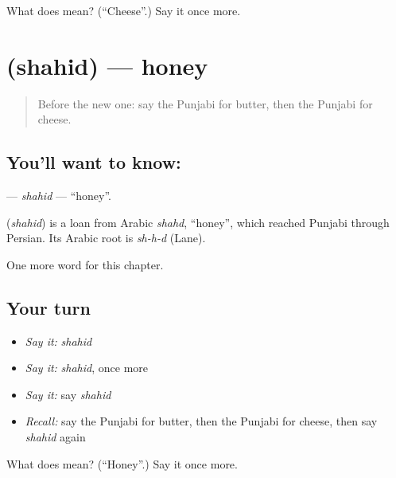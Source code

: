 \begin{tcolorbox}[breakable,colback=teal!4,colframe=teal!35!black,title={Before you move on}]
What does  mean? (\textquotedblleft{}Cheese\textquotedblright{}.) Say it once more.
\end{tcolorbox}
\section[\texorpdfstring{\pa{ਸ਼ਹਿਦ} (shahid)}{ਸ਼ਹਿਦ (shahid)}]{ (shahid) — honey}

\label{lesson:PA-C66-shahid}



\begin{quote}
Before the new one: say the Punjabi for butter, then the Punjabi for cheese.
\end{quote}

\subsection*{You'll want to know: }
\textbf{} — \emph{shahid} — \textquotedblleft{}honey\textquotedblright{}.

\begin{cousinweb}
\textbf{} (\emph{shahid}) is a loan from Arabic \emph{shahd}, \textquotedblleft{}honey\textquotedblright{}, which reached Punjabi through Persian. Its Arabic root is \emph{sh-h-d} (Lane).
\end{cousinweb}

\begin{grammarlens}[title={What you've built}]
One more word for this chapter.
\end{grammarlens}

\subsection*{Your turn}
\begin{itemize}
\raggedright
  \item \emph{Say it:} \emph{shahid}
  \item \emph{Say it:} \emph{shahid}, once more
  \item \emph{Say it:} say \emph{shahid}
  \item \emph{Recall:} say the Punjabi for butter, then the Punjabi for cheese, then say \emph{shahid} again
\end{itemize}

\begin{tcolorbox}[breakable,colback=teal!4,colframe=teal!35!black,title={Before you move on}]
What does  mean? (\textquotedblleft{}Honey\textquotedblright{}.) Say it once more.
\end{tcolorbox}
